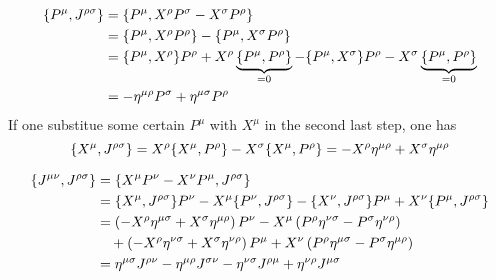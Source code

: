 \begin{enumerate}[label=(\alph*)]
		\begin{align}
			\acomm{P^\mu}{J^{\rho\sigma}} &=  \acomm{P^{\mu}}{X^\rho P^{\sigma} - X^\sigma P^{\rho}} \notag \\
													&= \acomm{P^\mu}{X^\rho P^\rho} - \acomm{P^\mu}{X^\sigma P^\rho} \notag \\
													&= \acomm{P^\mu}{X^\rho} P^\rho + X^\rho \underbrace{\acomm{P^\mu}{P^\rho}}_{=0} - \acomm{P^\mu}{X^\sigma}P^\rho - X^\sigma\underbrace{\acomm{P^\mu}{P^\rho}}_{=0} \notag  \\
													&= -\eta^{\mu\rho} P^\sigma + \eta^{\mu\sigma} P^\rho
		\end{align}
		If one substitue some certain $P^\mu$ with $X^\mu$ in the second last step, one has
		\begin{equation*}
			\acomm{X^\mu}{J^{\rho\sigma}} = X^\rho \acomm{X^\mu}{P^\rho} - X^\sigma \acomm{X^\mu}{P^\rho} = - X^\rho \eta^{\mu\rho} + X^\sigma \eta^{\mu\rho}
		\end{equation*}

		\begin{align}
			\acomm{J^{\mu\nu}}{J^{\rho\sigma}} &= \acomm{X^\mu	P^\nu - X^\nu P^\mu}{J^{\rho\sigma}} \notag \\
														  &= \acomm{X^\mu}{J^{\rho\sigma}} P^\nu - X^\mu \acomm{P^\nu}{J^{\rho\sigma}} - \acomm{X^\nu}{J^{\rho\sigma}} P^\mu + X^\nu \acomm{P^\mu}{J^{\rho\sigma}} \notag \\
														  &= \left( - X^\rho \eta^{\mu\sigma} + X^\sigma \eta^{\mu\rho} \right) P^\nu - X^\mu \left( P^\rho \eta^{\nu\sigma} - P^\sigma \eta^{\nu\rho} \right) \notag \\
														  &\quad + \left( - X^\rho \eta^{\nu\sigma} + X^\sigma \eta^{\nu\rho} \right) P^\mu + X^\nu \left( P^\rho \eta^{\mu\sigma} - P^\sigma \eta^{\mu\rho} \right) \notag \\
														  &= \eta^{\mu\sigma} J^{\rho\nu} - \eta^{\mu\rho} J^{\sigma\nu} - \eta^{\nu\sigma} J^{\rho\mu} + \eta^{\nu\rho} J^{\mu\sigma}
		\end{align}
\end{enumerate}
